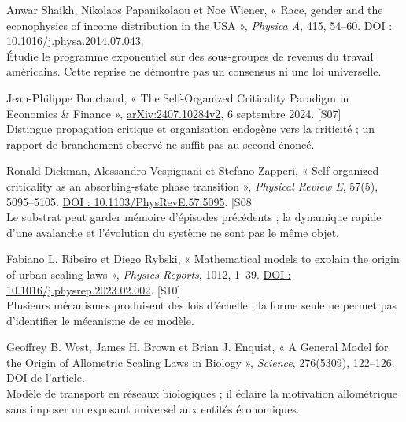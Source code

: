 \begin{description}[leftmargin=1.6em,style=nextline,itemsep=0.35em]
\item[Shaikh, Papanikolaou et Wiener (2014)] Anwar Shaikh, Nikolaos
  Papanikolaou et Noe Wiener, « Race, gender and the econophysics of income
  distribution in the USA », \emph{Physica A}, 415, 54--60.
  \href{https://doi.org/10.1016/j.physa.2014.07.043}{DOI : 10.1016/j.physa.2014.07.043}.\\
  Étudie le programme exponentiel sur des sous-groupes de revenus du travail
  américains. Cette reprise ne démontre pas un consensus ni une loi universelle.

\item[Bouchaud (2024)] Jean-Philippe Bouchaud, « The Self-Organized Criticality
  Paradigm in Economics \& Finance », \href{https://arxiv.org/abs/2407.10284v2}{arXiv:2407.10284v2},
  6 septembre 2024. \textsf{[S07]}\\
  Distingue propagation critique et organisation endogène vers la criticité ;
  un rapport de branchement observé ne suffit pas au second énoncé.

\item[Dickman, Vespignani et Zapperi (1998)] Ronald Dickman, Alessandro
  Vespignani et Stefano Zapperi, « Self-organized criticality as an
  absorbing-state phase transition », \emph{Physical Review E}, 57(5),
  5095--5105. \href{https://doi.org/10.1103/PhysRevE.57.5095}{DOI : 10.1103/PhysRevE.57.5095}.
  \textsf{[S08]}\\
  Le substrat peut garder mémoire d'épisodes précédents ; la dynamique rapide
  d'une avalanche et l'évolution du système ne sont pas le même objet.

\item[Ribeiro et Rybski (2023)] Fabiano L. Ribeiro et Diego Rybski,
  « Mathematical models to explain the origin of urban scaling laws »,
  \emph{Physics Reports}, 1012, 1--39.
  \href{https://doi.org/10.1016/j.physrep.2023.02.002}{DOI : 10.1016/j.physrep.2023.02.002}.
  \textsf{[S10]}\\
  Plusieurs mécanismes produisent des lois d'échelle : la forme seule ne
  permet pas d'identifier le mécanisme de ce modèle.

\item[West, Brown et Enquist (1997)] Geoffrey B. West, James H. Brown et
  Brian J. Enquist, « A General Model for the Origin of Allometric Scaling
  Laws in Biology », \emph{Science}, 276(5309), 122--126.
  \href{https://doi.org/10.1126/science.276.5309.122}{DOI de l'article}.\\
  Modèle de transport en réseaux biologiques ; il éclaire la motivation
  allométrique sans imposer un exposant universel aux entités économiques.


\end{description}
